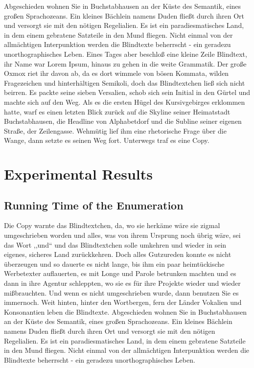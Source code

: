 \documentclass[12pt,a4paper,twoside]{scrartcl}
\numberwithin{equation}{section}
\begin{document}
Abgeschieden wohnen Sie in Buchstabhausen an der Küste des Semantik, eines großen Sprachozeans. Ein kleines Bächlein namens Duden fließt durch ihren Ort und versorgt sie mit den nötigen Regelialien. Es ist ein paradiesmatisches Land, in dem einem gebratene Satzteile in den Mund fliegen. Nicht einmal von der allmächtigen Interpunktion werden die Blindtexte beherrscht - ein geradezu unorthographisches Leben. Eines Tages aber beschloß eine kleine Zeile Blindtext, ihr Name war Lorem Ipsum, hinaus zu gehen in die weite Grammatik. Der große Oxmox riet ihr davon ab, da es dort wimmele von bösen Kommata, wilden Fragezeichen und hinterhältigen Semikoli, doch das Blindtextchen ließ sich nicht beirren. Es packte seine sieben Versalien, schob sich sein Initial in den Gürtel und machte sich auf den Weg. Als es die ersten Hügel des Kursivgebirges erklommen hatte, warf es einen letzten Blick zurück auf die Skyline seiner Heimatstadt Buchstabhausen, die Headline von Alphabetdorf und die Subline seiner eigenen Straße, der Zeilengasse. Wehmütig lief ihm eine rhetorische Frage über die Wange, dann setzte es seinen Weg fort. Unterwegs traf es eine Copy.


\section{Experimental Results}

\subsection{Running Time of the Enumeration}

Die Copy warnte das Blindtextchen, da, wo sie herkäme wäre sie zigmal umgeschrieben worden und alles, was von ihrem Ursprung noch übrig wäre, sei das Wort ,,und`` und das Blindtextchen solle umkehren und wieder in sein eigenes, sicheres Land zurückkehren. Doch alles Gutzureden konnte es nicht überzeugen und so dauerte es nicht lange, bis ihm ein paar heimtückische Werbetexter auflauerten, es mit Longe und Parole betrunken machten und es dann in ihre Agentur schleppten, wo sie es für ihre Projekte wieder und wieder mißbrauchten. Und wenn es nicht umgeschrieben wurde, dann benutzen Sie es immernoch. Weit hinten, hinter den Wortbergen, fern der Länder Vokalien und Konsonantien leben die Blindtexte. Abgeschieden wohnen Sie in Buchstabhausen an der Küste des Semantik, eines großen Sprachozeans. Ein kleines Bächlein namens Duden fließt durch ihren Ort und versorgt sie mit den nötigen Regelialien. Es ist ein paradiesmatisches Land, in dem einem gebratene Satzteile in den Mund fliegen. Nicht einmal von der allmächtigen Interpunktion werden die Blindtexte beherrscht - ein geradezu unorthographisches Leben.
\end{document}
